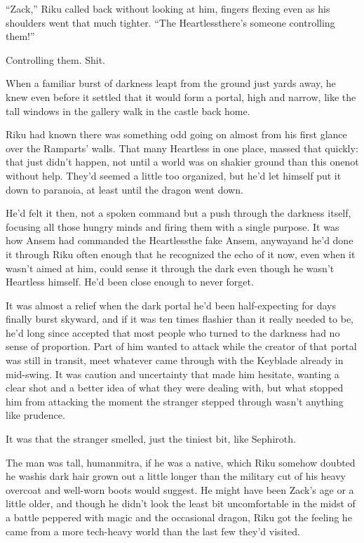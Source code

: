 ``Zack,'' Riku called back without looking at him, fingers flexing even as his shoulders went that much tighter. ``The Heartless\textemdash there's someone controlling them!''

Controlling them. Shit.

When a familiar burst of darkness leapt from the ground just yards away, he knew even before it settled that it would form a portal, high and narrow, like the tall windows in the gallery walk in the castle back home.


\scenechange


Riku had known there was something odd going on almost from his first glance over the Ramparts' walls. That many Heartless in one place, massed that quickly: that just didn't happen, not until a world was on shakier ground than this one\textemdash not without help. They'd seemed a little too organized, but he'd let himself put it down to paranoia, at least until the dragon went down.

He'd felt it then, not a spoken command but a push through the darkness itself, focusing all those hungry minds and firing them with a single purpose. It was how Ansem had commanded the Heartless\textemdash the fake Ansem, anyway\textemdash and he'd done it through Riku often enough that he recognized the echo of it now, even when it wasn't aimed at him, could sense it through the dark even though he wasn't Heartless himself. He'd been close enough to never forget.

It was almost a relief when the dark portal he'd been half-expecting for days finally burst skyward, and if it was ten times flashier than it really needed to be, he'd long since accepted that most people who turned to the darkness had no sense of proportion. Part of him wanted to attack while the creator of that portal was still in transit, meet whatever came through with the Keyblade already in mid-swing. It was caution and uncertainty that made him hesitate, wanting a clear shot and a better idea of what they were dealing with, but what stopped him from attacking the moment the stranger stepped through wasn't anything like prudence.

It was that the stranger smelled, just the tiniest bit, like Sephiroth.

The man was tall, human\textemdash mitra, if he was a native, which Riku somehow doubted he was\textemdash his dark hair grown out a little longer than the military cut of his heavy overcoat and well-worn boots would suggest. He might have been Zack's age or a little older, and though he didn't look the least bit uncomfortable in the midst of a battle peppered with magic and the occasional dragon, Riku got the feeling he came from a more tech-heavy world than the last few they'd visited.

